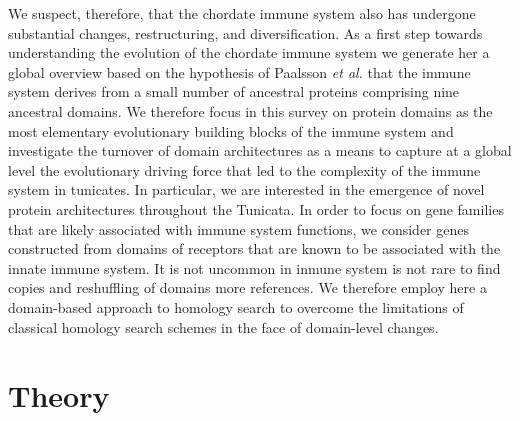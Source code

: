 \documentclass[11pt]{article}
\newcommand{\TODO}[1]{\begingroup\color{red}#1\endgroup}
\begin{document}
We suspect, therefore, that the chordate immune system also has undergone
substantial changes, restructuring, and diversification. As a first step
towards understanding the evolution of the chordate immune system we
generate her a global overview based on the hypothesis of Paalsson \emph{et
  al.} \cite{paalsson2007building} that the immune system derives from a
small number of ancestral proteins comprising nine ancestral domains.  We
therefore focus in this survey on protein domains as the most elementary
evolutionary building blocks of the immune system and investigate the
turnover of domain architectures as a means to capture at a global level
the evolutionary driving force that led to the complexity of the immune
system in tunicates. In particular, we are interested in the emergence of
novel protein architectures throughout the Tunicata. In order to focus on
gene families that are likely associated with immune system functions, we
consider genes constructed from domains of receptors that are known to be
associated with the innate immune system. It is not uncommon in inmune
system is not rare to find copies and reshuffling of domains
\cite{Forslund2012} \TODO{more references}. We therefore employ here a
domain-based approach to homology search to overcome the limitations of
classical homology search schemes in the face of domain-level changes.

\section*{Theory}
\end{document}
